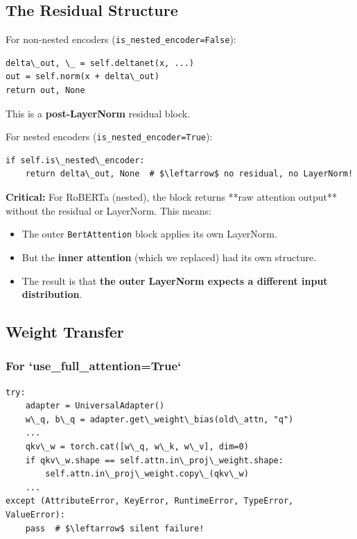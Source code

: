 \subsection{The Residual Structure}

For non-nested encoders (\texttt{is\_nested\_encoder=False}):

\begin{lstlisting}
delta\_out, \_ = self.deltanet(x, ...)
out = self.norm(x + delta\_out)
return out, None
\end{lstlisting}

This is a \textbf{post-LayerNorm} residual block.

For nested encoders (\texttt{is\_nested\_encoder=True}):

\begin{lstlisting}
if self.is\_nested\_encoder:
    return delta\_out, None  # $\leftarrow$ no residual, no LayerNorm!
\end{lstlisting}

\textbf{Critical:} For RoBERTa (nested), the block returns **raw attention 
output** without the residual or LayerNorm. This means:
\begin{itemize}
\item The outer \texttt{BertAttention} block applies its own LayerNorm.
\item But the \textbf{inner attention} (which we replaced) had its own structure.
\item The result is that \textbf{the outer LayerNorm expects a different input distribution}.

\end{itemize}
\subsection{Weight Transfer}

\subsubsection{For `use\_full\_attention=True`}

\begin{lstlisting}
try:
    adapter = UniversalAdapter()
    w\_q, b\_q = adapter.get\_weight\_bias(old\_attn, "q")
    ...
    qkv\_w = torch.cat([w\_q, w\_k, w\_v], dim=0)
    if qkv\_w.shape == self.attn.in\_proj\_weight.shape:
        self.attn.in\_proj\_weight.copy\_(qkv\_w)
    ...
except (AttributeError, KeyError, RuntimeError, TypeError, ValueError):
    pass  # $\leftarrow$ silent failure!
\end{lstlisting}

